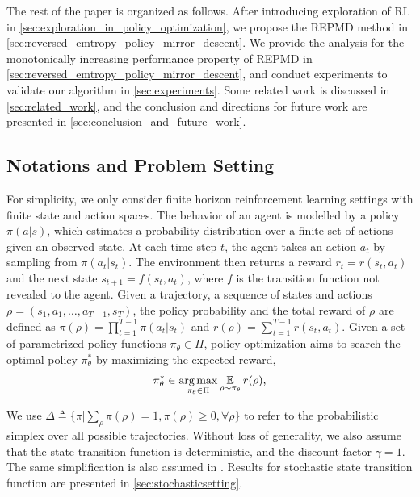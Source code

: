 The rest of the paper is organized as follows. After introducing exploration of RL in \cref{sec:exploration_in_policy_optimization}, we propose the REPMD method in \cref{sec:reversed_emtropy_policy_mirror_descent}. We provide the analysis for the monotonically increasing performance property of REPMD in \cref{sec:reversed_emtropy_policy_mirror_descent}, and conduct experiments to validate our algorithm in \cref{sec:experiments}. Some related work is discussed in \cref{sec:related_work}, and the conclusion and directions for future work are presented in \cref{sec:conclusion_and_future_work}.
\fi
\subsection{Notations and Problem Setting}
\label{subsec:notations_and_settings}
For simplicity, we only consider finite horizon reinforcement learning settings with finite state and action spaces. 
The behavior of an agent is modelled by a policy $\pi(a|s)$, which estimates a probability distribution over a finite set of actions given an observed state. 
At each time step $t$, the agent takes an action $a_t$ by sampling from $\pi(a_t | s_t)$. The environment then returns a reward $r_t = r(s_t, a_t)$ and the next state $s_{t+1} = f(s_t, a_t)$, where $f$ is the transition function not revealed to the agent.
Given a trajectory, a sequence of states and actions $\rho=(s_1, a_1, \dots, a_{T-1}, s_T)$, the policy probability and the total reward of $\rho$ are defined as $\pi(\rho) = \prod_{t=1}^{T-1} \pi(a_t| s_t)$ and $r(\rho) = \sum_{t=1}^{T-1} r(s_t, a_t)$. 
Given a set of parametrized policy functions $\pi_\theta \in \Pi$, policy optimization aims to search the optimal policy $\pi_\theta^*$ by maximizing the expected reward,
\begin{equation}
\label{max_expected_reward}
\begin{split}
\pi_\theta^* \in \operatorname*{arg\,max}_{\pi_\theta \in \Pi}{ \operatorname*{\mathbb{E}}\limits_{\rho \sim \pi_\theta}{r(\rho)} },
\end{split}
\end{equation}

We use $\Delta \triangleq \{ \pi | \sum_{\rho}{\pi(\rho)} = 1, \pi(\rho) \ge 0, \forall \rho \}$ to refer to the probabilistic simplex over all possible trajectories. 
Without loss of generality, we also assume that the state transition function is deterministic, and the discount factor $\gamma = 1$.
The same simplification is also assumed in \citet{nachum2017improving}. 
Results for stochastic state transition function are presented in \cref{sec:stochasticsetting}.